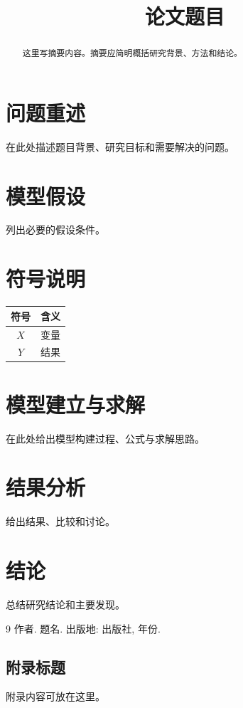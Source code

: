 \documentclass[withoutpreface]{cumcmthesis}
\title{论文题目}
\begin{document}
\maketitle

\begin{abstract}
这里写摘要内容。摘要应简明概括研究背景、方法和结论。
\end{abstract}

\section{问题重述}
在此处描述题目背景、研究目标和需要解决的问题。

\section{模型假设}
列出必要的假设条件。

\section{符号说明}
\begin{center}
\begin{tabular}{cc}
\hline
符号 & 含义 \\
\hline
$X$ & 变量 \\
$Y$ & 结果 \\
\hline
\end{tabular}
\end{center}

\section{模型建立与求解}
在此处给出模型构建过程、公式与求解思路。

\section{结果分析}
给出结果、比较和讨论。

\section{结论}
总结研究结论和主要发现。

\begin{thebibliography}{9}
 作者. 题名. 出版地: 出版社, 年份.
\end{thebibliography}

\begin{appendices}
\section{附录标题}
附录内容可放在这里。
\end{appendices}
\end{document}
